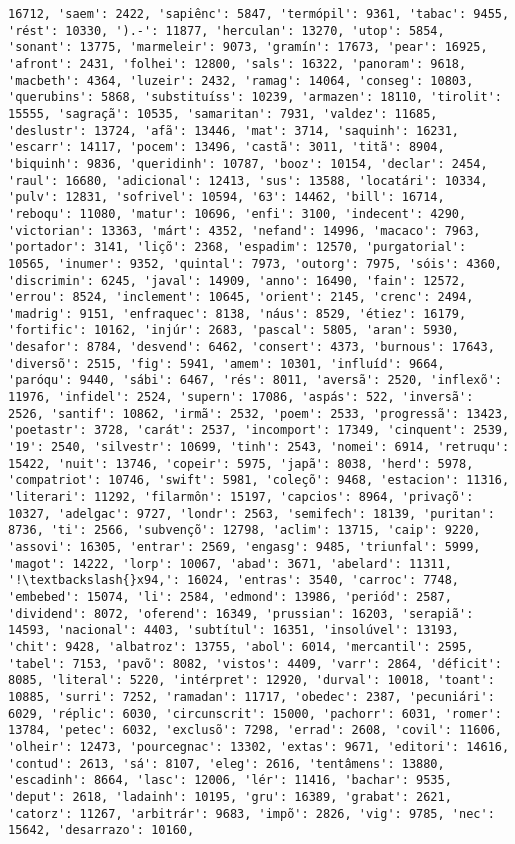 \documentclass[11pt]{article}
\begin{document}
\begin{Verbatim}[commandchars=\\\{\}]
16712, 'saem': 2422, 'sapiênc': 5847, 'termópil': 9361, 'tabac': 9455, 'rést': 10330, ').-': 11877, 'herculan': 13270, 'utop': 5854, 'sonant': 13775, 'marmeleir': 9073, 'gramín': 17673, 'pear': 16925, 'afront': 2431, 'folhei': 12800, 'sals': 16322, 'panoram': 9618, 'macbeth': 4364, 'luzeir': 2432, 'ramag': 14064, 'conseg': 10803, 'querubins': 5868, 'substituíss': 10239, 'armazen': 18110, 'tirolit': 15555, 'sagraçã': 10535, 'samaritan': 7931, 'valdez': 11685, 'deslustr': 13724, 'afã': 13446, 'mat': 3714, 'saquinh': 16231, 'escarr': 14117, 'pocem': 13496, 'castã': 3011, 'titã': 8904, 'biquinh': 9836, 'queridinh': 10787, 'booz': 10154, 'declar': 2454, 'raul': 16680, 'adicional': 12413, 'sus': 13588, 'locatári': 10334, 'pulv': 12831, 'sofrivel': 10594, '63': 14462, 'bill': 16714, 'reboqu': 11080, 'matur': 10696, 'enfi': 3100, 'indecent': 4290, 'victorian': 13363, 'márt': 4352, 'nefand': 14996, 'macaco': 7963, 'portador': 3141, 'liçõ': 2368, 'espadim': 12570, 'purgatorial': 10565, 'inumer': 9352, 'quintal': 7973, 'outorg': 7975, 'sóis': 4360, 'discrimin': 6245, 'javal': 14909, 'anno': 16490, 'fain': 12572, 'errou': 8524, 'inclement': 10645, 'orient': 2145, 'crenc': 2494, 'madrig': 9151, 'enfraquec': 8138, 'náus': 8529, 'étiez': 16179, 'fortific': 10162, 'injúr': 2683, 'pascal': 5805, 'aran': 5930, 'desafor': 8784, 'desvend': 6462, 'consert': 4373, 'burnous': 17643, 'diversõ': 2515, 'fig': 5941, 'amem': 10301, 'influíd': 9664, 'paróqu': 9440, 'sábi': 6467, 'rés': 8011, 'aversã': 2520, 'inflexõ': 11976, 'infidel': 2524, 'supern': 17086, 'aspás': 522, 'inversã': 2526, 'santif': 10862, 'irmã': 2532, 'poem': 2533, 'progressã': 13423, 'poetastr': 3728, 'carát': 2537, 'incomport': 17349, 'cinquent': 2539, '19': 2540, 'silvestr': 10699, 'tinh': 2543, 'nomei': 6914, 'retruqu': 15422, 'nuit': 13746, 'copeir': 5975, 'japã': 8038, 'herd': 5978, 'compatriot': 10746, 'swift': 5981, 'coleçõ': 9468, 'estacion': 11316, 'literari': 11292, 'filarmôn': 15197, 'capcios': 8964, 'privaçõ': 10327, 'adelgac': 9727, 'londr': 2563, 'semifech': 18139, 'puritan': 8736, 'ti': 2566, 'subvençõ': 12798, 'aclim': 13715, 'caip': 9220, 'assovi': 16305, 'entrar': 2569, 'engasg': 9485, 'triunfal': 5999, 'magot': 14222, 'lorp': 10067, 'abad': 3671, 'abelard': 11311, '!\textbackslash{}x94,': 16024, 'entras': 3540, 'carroc': 7748, 'embebed': 15074, 'li': 2584, 'edmond': 13986, 'periód': 2587, 'dividend': 8072, 'oferend': 16349, 'prussian': 16203, 'serapiã': 14593, 'nacional': 4403, 'subtítul': 16351, 'insolúvel': 13193, 'chit': 9428, 'albatroz': 13755, 'abol': 6014, 'mercantil': 2595, 'tabel': 7153, 'pavõ': 8082, 'vistos': 4409, 'varr': 2864, 'déficit': 8085, 'literal': 5220, 'intérpret': 12920, 'durval': 10018, 'toant': 10885, 'surri': 7252, 'ramadan': 11717, 'obedec': 2387, 'pecuniári': 6029, 'réplic': 6030, 'circunscrit': 15000, 'pachorr': 6031, 'romer': 13784, 'petec': 6032, 'exclusõ': 7298, 'errad': 2608, 'covil': 11606, 'olheir': 12473, 'pourcegnac': 13302, 'extas': 9671, 'editori': 14616, 'contud': 2613, 'sá': 8107, 'eleg': 2616, 'tentâmens': 13880, 'escadinh': 8664, 'lasc': 12006, 'lér': 11416, 'bachar': 9535, 'deput': 2618, 'ladainh': 10195, 'gru': 16389, 'grabat': 2621, 'catorz': 11267, 'arbitrár': 9683, 'impõ': 2826, 'vig': 9785, 'nec': 15642, 'desarrazo': 10160, 
\end{Verbatim}
\end{document}
